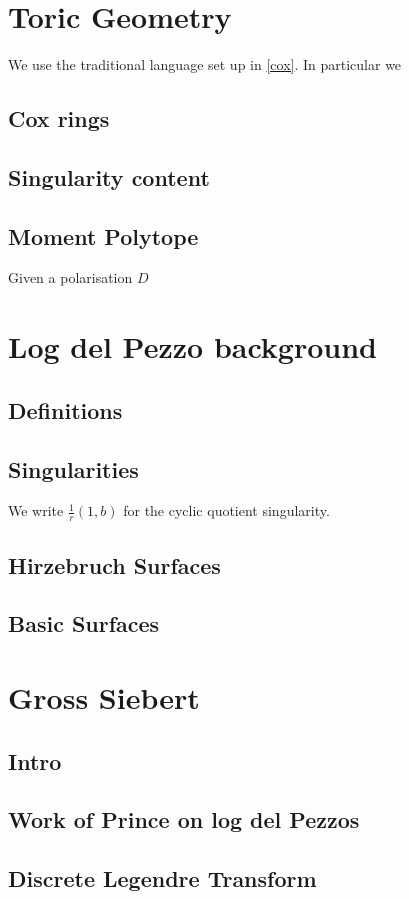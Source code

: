 \documentclass[12pt]{amsbook}
\theoremstyle{plain}
\begin{document}
 

\setcounter{chapter}{1}

\section{Toric Geometry}

We use the traditional language set up in \ref{cox}. In particular we 
\subsection{Cox rings}

\subsection{Singularity content}

\subsection{Moment Polytope}
Given a polarisation $D$ 

\section{Log del Pezzo background}

\subsection{Definitions}
\subsection{Singularities} 
We write $\frac{1}{r}(1, b)$ for the cyclic quotient singularity. 
\subsection{Hirzebruch Surfaces} %
\subsection{Basic Surfaces}

\section{Gross Siebert}

\subsection{Intro} %
\subsection{Work of Prince on log del Pezzos} %
\subsection{Discrete Legendre Transform} %
\end{document}
